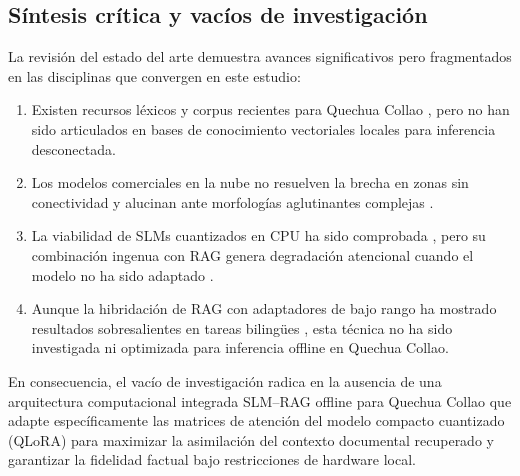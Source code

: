 \subsection{Síntesis crítica y vacíos de investigación}
La revisión del estado del arte demuestra avances significativos pero fragmentados en las disciplinas que convergen en este estudio:
\begin{enumerate}
    \item Existen recursos léxicos y corpus recientes para Quechua Collao \citep{Orcotoma2025, Duran2026}, pero no han sido articulados en bases de conocimiento vectoriales locales para inferencia desconectada.
    \item Los modelos comerciales en la nube no resuelven la brecha en zonas sin conectividad y alucinan ante morfologías aglutinantes complejas \citep{Court2024}.
    \item La viabilidad de SLMs cuantizados en CPU ha sido comprobada \citep{Walusimbi2026}, pero su combinación ingenua con RAG genera degradación atencional cuando el modelo no ha sido adaptado \citep{Hevia2025}.
    \item Aunque la hibridación de RAG con adaptadores de bajo rango ha mostrado resultados sobresalientes en tareas bilingües \citep{Chen2024, Zhang2024RAFT}, esta técnica no ha sido investigada ni optimizada para inferencia offline en Quechua Collao.
\end{enumerate}

En consecuencia, el vacío de investigación radica en la ausencia de una arquitectura computacional integrada SLM--RAG offline para Quechua Collao que adapte específicamente las matrices de atención del modelo compacto cuantizado (QLoRA) para maximizar la asimilación del contexto documental recuperado y garantizar la fidelidad factual bajo restricciones de hardware local.

